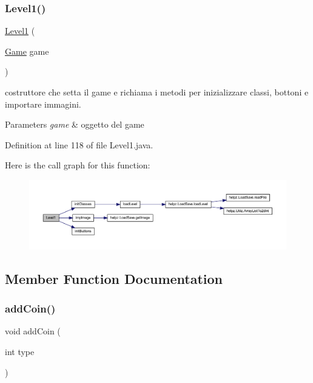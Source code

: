 \subsubsection{\texorpdfstring{Level1()}{Level1()}}
{\footnotesize\ttfamily \hyperlink{classscenes_1_1_level1}{Level1} (\begin{DoxyParamCaption}\item[{\hyperlink{classprogetto_1_1_game}{Game}}]{game }\end{DoxyParamCaption})}



costruttore che setta il game e richiama i metodi per inizializzare classi, bottoni e importare immagini. 


\begin{DoxyParams}{Parameters}
{\em game} & oggetto del game \\
\hline
\end{DoxyParams}


Definition at line 118 of file Level1.\+java.

Here is the call graph for this function\+:
\nopagebreak
\begin{figure}[H]
\begin{center}
\leavevmode
\includegraphics[width=350pt]{classscenes_1_1_level1_a0662011b3c0aa5d7dd21ce7cf353c3a0_cgraph}
\end{center}
\end{figure}


\subsection{Member Function Documentation}
\mbox{\label{classscenes_1_1_level1_a9f0f7dc28e596d2ebcd06e27ef05d9fd}} 
\subsubsection{\texorpdfstring{add\+Coin()}{addCoin()}}
{\footnotesize\ttfamily void add\+Coin (\begin{DoxyParamCaption}\item[{int}]{type }\end{DoxyParamCaption})}



